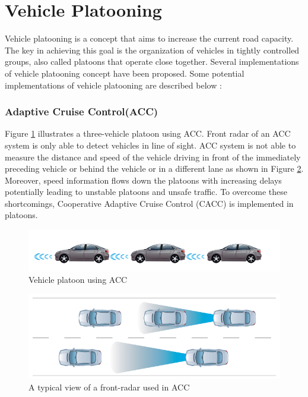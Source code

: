 \section{Vehicle Platooning}
Vehicle platooning is a concept that aims to increase the current road capacity. The key in achieving this goal is the organization of vehicles in tightly controlled groups, also called platoons that operate close together. Several implementations of vehicle platooning concept have been proposed. Some potential implementations of vehicle platooning are described below \cite{vugts2010string}:

\subsubsection{Adaptive Cruise Control(ACC)}
Figure \ref{fig:Vehicle Platoon using ACC} illustrates a three-vehicle platoon using ACC. Front radar of an ACC system is only able to detect vehicles in line of sight. ACC system is not able to measure the distance and speed of the vehicle driving in front of the immediately preceding vehicle or behind the vehicle or in a different lane as shown in Figure \ref{fig:A typical view of a front-radar used in ACC}. Moreover, speed information flows down the platoons with increasing delays potentially leading to unstable platoons and unsafe traffic. To overcome these shortcomings, Cooperative Adaptive Cruise Control (CACC) is implemented in platoons. 

\begin{figure}[h!]
    \includegraphics[width=1\textwidth]{figures/vehiclePlatoonusingACC.png}
    \centering
    \caption{Vehicle platoon using ACC}
    \label{fig:Vehicle Platoon using ACC}    
\end{figure}

\begin{figure}[h!]
    \includegraphics[width=1\textwidth]{figures/typicalviewoffrontradarusingACC.png}
    \centering
    \caption{A typical view of a front-radar used in ACC}
    \label{fig:A typical view of a front-radar used in ACC}    
\end{figure}

